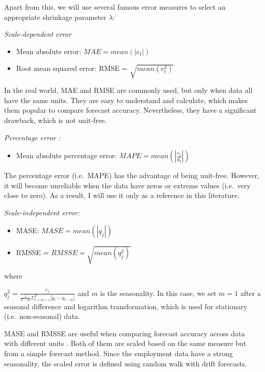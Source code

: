 \documentclass{monashthesis}
\begin{document}
Apart from this, we will use several famous error measures to select an appropriate shrinkage parameter \(\lambda\):

\emph{Scale-dependent error}

\begin{itemize}
\item
  Mean absolute error: \(MAE = mean(|e_t|)\)
\item
  Root mean squared error: RMSE = \(\sqrt{mean(e_t^2)}\)
\end{itemize}

In the real world, MAE and RMSE are commonly used, but only when data all have the same units. They are easy to understand and calculate, which makes them popular to compare forecast accuracy. Nevertheless, they have a significant drawback, which is not unit-free.

\emph{Percentage error :}

\begin{itemize}
\tightlist
\item
  Mean absolute percentage error: \(MAPE = mean(|\frac{e_t}{y_t}|)\)
\end{itemize}

The percentage error (i.e.~MAPE) has the advantage of being unit-free. However, it will become unreliable when the data have zeros or extreme values (i.e.~very close to zero). As a result, I will use it only as a reference in this literature.

\emph{Scale-independent error:}

\begin{itemize}
\item
  MASE: \(MASE = mean(|q_j|)\)
\item
  RMSSE = \(RMSSE=\sqrt{mean(q_j^2)}\)
\end{itemize}

where

\(q_j^2=\frac{e_j}{\frac{1}{T-m}\Sigma^T_{t=m+1}|y_t-y_{t-m}|}\) and \(m\) is the seasonality. In this case, we set \(m=1\) after a seasonal difference and logarithm transformation, which is used for stationary (i.e.~non-seasonal) data.

MASE and RMSSE are useful when comparing forecast accuracy across data with different units \autocite{hyndman2006}. Both of them are scaled based on the same measure but from a simple forecast method. Since the employment data have a strong seasonality, the scaled error is defined using random walk with drift forecasts.

\vspace{24pt}
\end{document}
